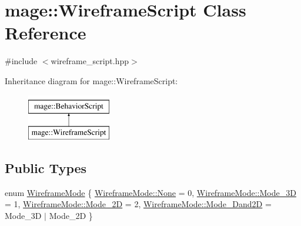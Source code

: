 \hypertarget{classmage_1_1_wireframe_script}{}\section{mage\+:\+:Wireframe\+Script Class Reference}
\label{classmage_1_1_wireframe_script}


{\ttfamily \#include $<$wireframe\+\_\+script.\+hpp$>$}

Inheritance diagram for mage\+:\+:Wireframe\+Script\+:\begin{figure}[H]
\begin{center}
\leavevmode
\includegraphics[height=2.000000cm]{classmage_1_1_wireframe_script}
\end{center}
\end{figure}
\subsection*{Public Types}
\begin{DoxyCompactItemize}
\item 
enum \hyperlink{classmage_1_1_wireframe_script_a99d65e77e89c2581544e68030adcefb7}{Wireframe\+Mode} \{ \hyperlink{classmage_1_1_wireframe_script_a99d65e77e89c2581544e68030adcefb7a6adf97f83acf6453d4a6a4b1070f3754}{Wireframe\+Mode\+::\+None} = 0, 
\hyperlink{classmage_1_1_wireframe_script_a99d65e77e89c2581544e68030adcefb7a742c1f149bc25120b2fd77049b7c274f}{Wireframe\+Mode\+::\+Mode\+\_\+3D} = 1, 
\hyperlink{classmage_1_1_wireframe_script_a99d65e77e89c2581544e68030adcefb7a3525290b9dc3c8a99ac8c19cc595019a}{Wireframe\+Mode\+::\+Mode\+\_\+2D} = 2, 
\hyperlink{classmage_1_1_wireframe_script_a99d65e77e89c2581544e68030adcefb7a7224928b7b56a4a36fd075ccbff53c41}{Wireframe\+Mode\+::\+Mode\+\_\+Dand2D} = Mode\+\_\+3D $\vert$ Mode\+\_\+2D
 \}
\end{DoxyCompactItemize}
